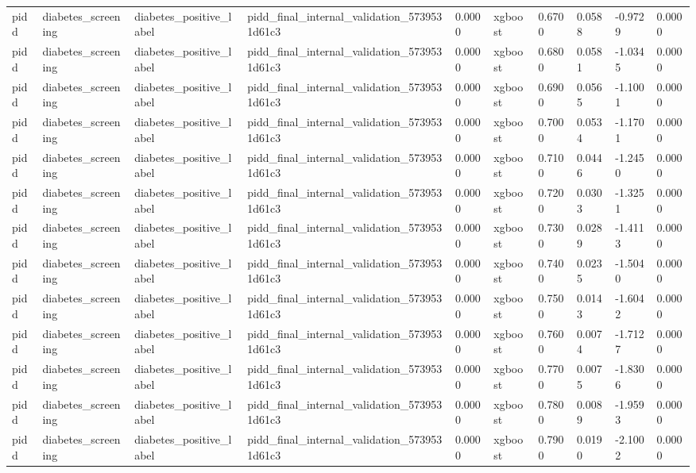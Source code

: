 \begin{tabular}{llllllllll}
pidd & diabetes\_screening & diabetes\_positive\_label & pidd\_final\_internal\_validation\_5739531d61c3 & 0.0000 & xgboost & 0.6700 & 0.0588 & -0.9729 & 0.0000 \\
pidd & diabetes\_screening & diabetes\_positive\_label & pidd\_final\_internal\_validation\_5739531d61c3 & 0.0000 & xgboost & 0.6800 & 0.0581 & -1.0345 & 0.0000 \\
pidd & diabetes\_screening & diabetes\_positive\_label & pidd\_final\_internal\_validation\_5739531d61c3 & 0.0000 & xgboost & 0.6900 & 0.0565 & -1.1001 & 0.0000 \\
pidd & diabetes\_screening & diabetes\_positive\_label & pidd\_final\_internal\_validation\_5739531d61c3 & 0.0000 & xgboost & 0.7000 & 0.0534 & -1.1701 & 0.0000 \\
pidd & diabetes\_screening & diabetes\_positive\_label & pidd\_final\_internal\_validation\_5739531d61c3 & 0.0000 & xgboost & 0.7100 & 0.0446 & -1.2450 & 0.0000 \\
pidd & diabetes\_screening & diabetes\_positive\_label & pidd\_final\_internal\_validation\_5739531d61c3 & 0.0000 & xgboost & 0.7200 & 0.0303 & -1.3251 & 0.0000 \\
pidd & diabetes\_screening & diabetes\_positive\_label & pidd\_final\_internal\_validation\_5739531d61c3 & 0.0000 & xgboost & 0.7300 & 0.0289 & -1.4113 & 0.0000 \\
pidd & diabetes\_screening & diabetes\_positive\_label & pidd\_final\_internal\_validation\_5739531d61c3 & 0.0000 & xgboost & 0.7400 & 0.0235 & -1.5040 & 0.0000 \\
pidd & diabetes\_screening & diabetes\_positive\_label & pidd\_final\_internal\_validation\_5739531d61c3 & 0.0000 & xgboost & 0.7500 & 0.0143 & -1.6042 & 0.0000 \\
pidd & diabetes\_screening & diabetes\_positive\_label & pidd\_final\_internal\_validation\_5739531d61c3 & 0.0000 & xgboost & 0.7600 & 0.0074 & -1.7127 & 0.0000 \\
pidd & diabetes\_screening & diabetes\_positive\_label & pidd\_final\_internal\_validation\_5739531d61c3 & 0.0000 & xgboost & 0.7700 & 0.0075 & -1.8306 & 0.0000 \\
pidd & diabetes\_screening & diabetes\_positive\_label & pidd\_final\_internal\_validation\_5739531d61c3 & 0.0000 & xgboost & 0.7800 & 0.0089 & -1.9593 & 0.0000 \\
pidd & diabetes\_screening & diabetes\_positive\_label & pidd\_final\_internal\_validation\_5739531d61c3 & 0.0000 & xgboost & 0.7900 & 0.0190 & -2.1002 & 0.0000 \\

\end{tabular}
